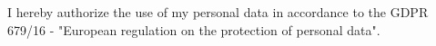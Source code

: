 

\begin{cvparagraph}

I hereby authorize the use of my personal data in accordance to the GDPR 679/16 - "European regulation on the protection of personal data".
\end{cvparagraph}